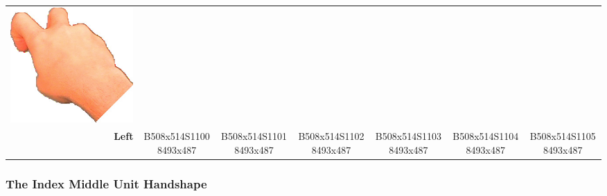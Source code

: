 \documentclass{article}
\begin{document}
\begin{center}
\begin{tabular}{r*{6}{c}}
\includegraphics[scale=0.1]{images/02-02-6.jpg}\\
\textbf{Left}&
B508x514S11008493x487&
B508x514S11018493x487&
B508x514S11028493x487&
B508x514S11038493x487&
B508x514S11048493x487&
B508x514S11058493x487\\
\end{tabular}
\end{center}

\subsubsection{The Index Middle Unit Handshape}
\end{document}
